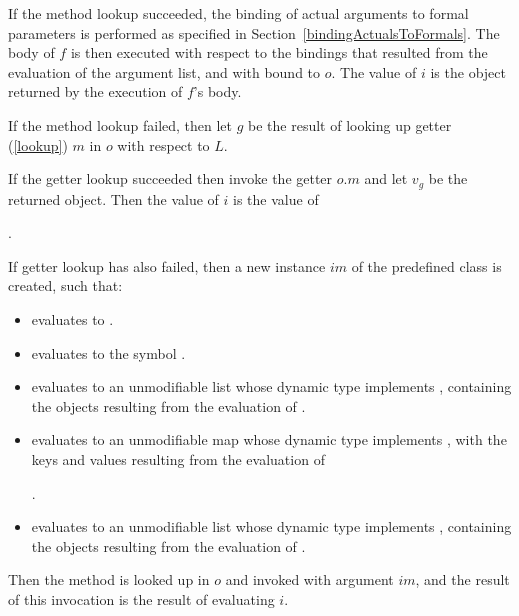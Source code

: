 \documentclass[makeidx]{article}
\begin{document}
{\LMHash{}%
If the method lookup succeeded,
the binding of actual arguments to formal parameters is performed
as specified in Section~\ref{bindingActualsToFormals}.
The body of $f$ is then executed with respect to the bindings
that resulted from the evaluation of the argument list,
and with \THIS{} bound to $o$.
The value of $i$ is the object returned by the execution of $f$'s body.

\LMHash{}%
If the method lookup failed,
then let $g$ be the result of looking up getter
(\ref{lookup})
$m$ in $o$ with respect to $L$.

\LMHash{}%
If the getter lookup succeeded then invoke the getter $o.m$
and let $v_g$ be the returned object.
Then the value of $i$ is the value of

\noindent
{}.

\LMHash{}%
If getter lookup has also failed,
then a new instance $im$ of the predefined class  is created,
such that:

\begin{itemize}
\item {} evaluates to \TRUE.
\item {} evaluates to the symbol .
\item {} evaluates to an unmodifiable list
  whose dynamic type implements ,
  containing the objects resulting from the evaluation of
  .
\item {} evaluates to an unmodifiable map
  whose dynamic type implements ,
  with the keys and values resulting from the evaluation of

  .
\item {} evaluates to an unmodifiable list
  whose dynamic type implements ,
  containing the objects resulting from the evaluation of
  .
\end{itemize}

\LMHash{}%
Then the method  is looked up in $o$ and
invoked with argument $im$,
and the result of this invocation is the result of evaluating $i$.

\EndCase


}
\end{document}
